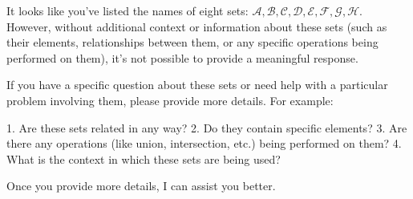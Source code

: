 It looks like you've listed the names of eight sets: \(\mathcal{A}, \mathcal{B}, \mathcal{C}, \mathcal{D}, \mathcal{E}, \mathcal{F}, \mathcal{G}, \mathcal{H}\). However, without additional context or information about these sets (such as their elements, relationships between them, or any specific operations being performed on them), it's not possible to provide a meaningful response.

If you have a specific question about these sets or need help with a particular problem involving them, please provide more details. For example:

1. Are these sets related in any way?
2. Do they contain specific elements?
3. Are there any operations (like union, intersection, etc.) being performed on them?
4. What is the context in which these sets are being used?

Once you provide more details, I can assist you better.
